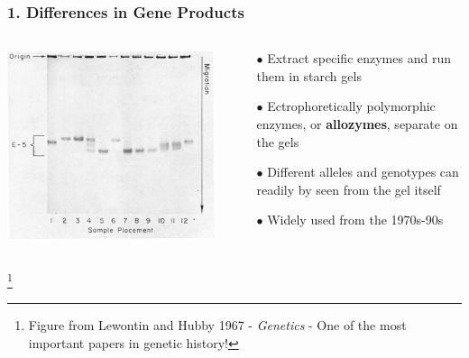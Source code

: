 \documentclass{beamer}
\newcommand\blfootnote[1]{%
	\begingroup
	\renewcommand\thefootnote{}\footnote{#1}%
	\addtocounter{footnote}{-1}%
	\endgroup
}
\begin{document}
	\begin{frame}
		\frametitle{1. Differences in Gene Products}
		
		
		\begin{columns}
			\begin{column}{0.5\textwidth}
				\includegraphics[keepaspectratio, width  = \textwidth]{img/LewontinHubby}
			\end{column}
			\begin{column}{0.5\textwidth}
				\begin{itemize}
					\item[$\bullet$] Extract specific enzymes and run them in starch gels
					\item[$\bullet$] Ectrophoretically polymorphic enzymes, or \textbf{allozymes}, separate on the gels
					\item[$\bullet$] Different alleles and genotypes can readily by seen from the gel itself
					\item[$\bullet$] Widely used from the 1970s-90s
				\end{itemize}
			\end{column}
		\end{columns}
		
		\blfootnote{Figure from Lewontin and Hubby 1967 - \textit{Genetics} - One of the most important papers in genetic history!}
		
		
	\end{frame}
\end{document}
